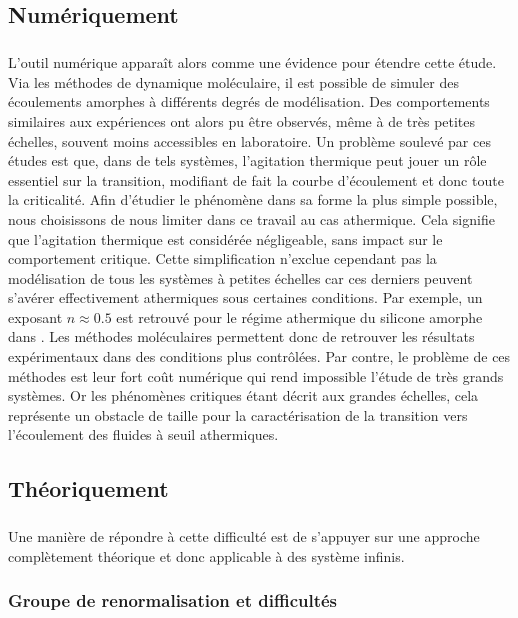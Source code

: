 \subsection{Numériquement}

\subparagraph{}L'outil numérique apparaît alors comme une évidence pour étendre cette étude. Via les méthodes de dynamique moléculaire, il est possible de simuler des écoulements amorphes à différents degrés de modélisation. Des comportements similaires aux expériences ont  alors pu être observés, même à de très petites échelles, souvent moins accessibles en laboratoire. Un problème soulevé par ces études est que, dans de tels systèmes, l'agitation thermique peut jouer un rôle essentiel sur la transition, modifiant de fait la courbe d'écoulement \cite{delbecq_rheological_2023} et donc toute la criticalité. Afin d'étudier le phénomène dans sa forme la plus simple possible, nous choisissons de nous limiter dans ce travail au cas athermique. Cela signifie que l'agitation thermique est considérée négligeable, sans impact sur le comportement critique. Cette simplification n'exclue cependant pas la modélisation de tous les systèmes à petites échelles car ces derniers peuvent s'avérer effectivement athermiques sous certaines conditions. Par exemple, un exposant $n\approx 0.5$ est retrouvé pour le régime athermique du silicone amorphe dans \cite{fusco_rheological_2014}. Les méthodes moléculaires permettent donc de retrouver les résultats expérimentaux dans des conditions plus contrôlées. Par contre, le problème de ces méthodes est leur fort coût numérique qui rend impossible l'étude de très grands systèmes. Or les phénomènes critiques étant décrit aux grandes échelles, cela représente un obstacle de taille pour la caractérisation de la transition vers l'écoulement des fluides à seuil athermiques.


\subsection{Théoriquement}

\subparagraph{}Une manière de répondre à cette difficulté est de s'appuyer sur une approche complètement théorique et donc applicable à des système infinis.

\subsubsection{Groupe de renormalisation et difficultés}

\label{sec:TheoEPM}

